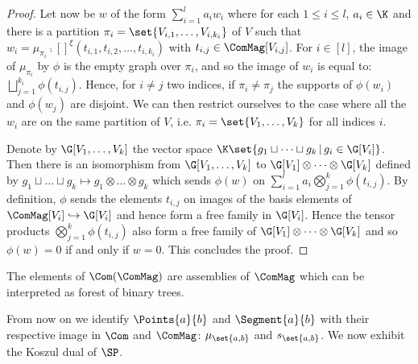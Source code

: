 \begin{proof}
    Let now be $w$ of the form $\sum_{i=1}^{l}a_iw_i$ where for each $1\leq i\leq l$, $a_i\in \K$ and there 
    is a partition $\pi_i=\set{V_{i,1},\dots, V_{i,k_i}}$ of $V$ such that 
    $w_i=\mu_{\pi_i}\comp[ ]^\xi (t_{i,1},t_{i,2},\dots, t_{i,k_i})$ with $t_{i,j}\in\ComMag[V_{i,j}]$.
    For $i\in[l]$, the image of $\mu_{\pi_i}$ by $\phi$ is the empty graph over $\pi_i$, and so the image 
    of $w_i$ is equal to: 
    \begin{math}
        \bigsqcup_{j=1}^{k_i}\phi(t_{i,j}).
    \end{math}
    Hence, for $i\not=j$ two indices, if $\pi_i\not= \pi_j$ the supports of $\phi(w_i)$ and $\phi(w_j)$ are 
    disjoint. We can then restrict ourselves to the case where all the $w_i$ are on the same partition of 
    $V$, i.e. $\pi_i=\set{V_1,\dots, V_k}$ for all indices $i$.

    Denote by $\G[V_1,\dots,V_k]$ the vector space $\K\set{g_1\sqcup\dots\sqcup g_k\,|\,g_i\in\G[V_i]}$. Then 
    there is an isomorphism from $\G[V_1,\dots,V_k]$ to $\G[V_1]\otimes\dots\otimes\G[V_k]$ defined by 
    $g_1\sqcup\dots\sqcup g_k \mapsto g_1\otimes\dots\otimes g_k$ which sends $\phi(w)$ on 
    $\sum_{i=1}^l a_i \bigotimes_{j=1}^{k}\phi(t_{i,j})$. By definition, $\phi$ sends the elements $t_{i,j}$ 
    on images of the basis elements of $\ComMag[V_i]\hookrightarrow\G[V_i]$ and hence form a free family in 
    $\G[V_i]$. Hence the tensor products $\bigotimes_{j=1}^{k}\phi(t_{i,j})$ also form a free family of 
    $\G[V_1]\otimes\dots\otimes\G[V_k]$ and so $\phi(w)=0$ if and only if $w=0$. This concludes the proof.
\end{proof}

\begin{rema}
    The elements of $\Com(\ComMag)$ are assemblies of $\ComMag$ which can be interpreted as forest of 
    binary trees.
\end{rema}

From now on we identify $\Points{a}{b}$ and $\Segment{a}{b}$ with their respective image in $\Com$ and 
$\ComMag$: $\mu_{\set{a,b}}$ and $s_{\set{a,b}}$. We now exhibit the Koszul dual of $\SP$. 

